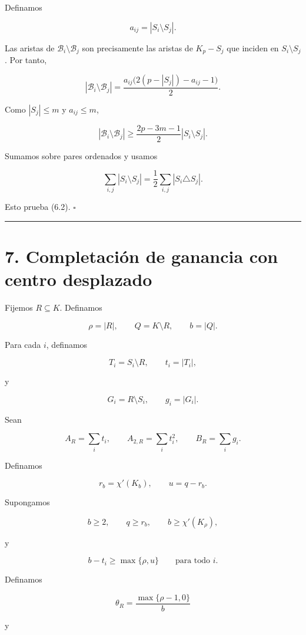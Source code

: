 \documentclass[
  11pt,
]{article}
\begin{document}
Definamos

\[
a_{ij}=|S_i\setminus S_j|.
\]

Las aristas de \(\mathcal B_i\setminus\mathcal B_j\) son precisamente las aristas de \(K_p-S_j\) que inciden en \(S_i\setminus S_j\). Por tanto,

\[
|\mathcal B_i\setminus\mathcal B_j|
=
\frac{a_{ij}\bigl(2(p-|S_j|)-a_{ij}-1\bigr)}2.
\]

Como \(|S_j|\le m\) y \(a_{ij}\le m\),

\[
|\mathcal B_i\setminus\mathcal B_j|
\ge
\frac{2p-3m-1}{2}|S_i\setminus S_j|.
\]

Sumamos sobre pares ordenados y usamos

\[
\sum_{i,j}|S_i\setminus S_j|
=
\frac12\sum_{i,j}|S_i\triangle S_j|.
\]

Esto prueba (6.2). \(\square\)

\begin{center}\rule{0.5\linewidth}{0.5pt}\end{center}

\section{7. Completación de ganancia con centro desplazado}\label{completaciuxf3n-de-ganancia-con-centro-desplazado}

Fijemos \(R\subseteq K\). Definamos

\[
\rho=|R|,
\qquad
Q=K\setminus R,
\qquad
b=|Q|.
\]

Para cada \(i\), definamos

\[
T_i=S_i\setminus R,
\qquad
t_i=|T_i|,
\]

y

\[
G_i=R\setminus S_i,
\qquad
g_i=|G_i|.
\]

Sean

\[
A_R=\sum_i t_i,
\qquad
A_{2,R}=\sum_i t_i^2,
\qquad
B_R=\sum_i g_i.
\]

Definamos

\[
r_b=\chi'(K_b),
\qquad
u=q-r_b.
\]

Supongamos

\[
b\ge2,
\qquad
q\ge r_b,
\qquad
b\ge\chi'(K_\rho),
\tag{7.1}
\]

y

\[
b-t_i\ge\max\{\rho,u\}
\qquad
\text{para todo }i.
\tag{7.2}
\]

Definamos

\[
\theta_R=\frac{\max\{\rho-1,0\}}{b}
\]

y
\end{document}
